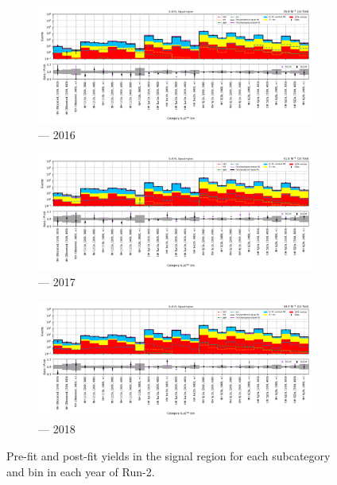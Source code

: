 \begin{figure}[htbp]
    \centering
    \begin{subfigure}[b]{0.9\textwidth}
        \includegraphics[width=\textwidth]{figures/mountain_ranges/2016/ttH/SR_tree_fit_s-abs_values_ttH_cats.pdf}
        \caption{\ttH --- 2016}
    \end{subfigure}

    \begin{subfigure}[b]{0.9\textwidth}
        \includegraphics[width=\textwidth]{figures/mountain_ranges/2017/ttH/SR_tree_fit_s-abs_values_ttH_cats.pdf}
        \caption{\ttH --- 2017}
    \end{subfigure}

    \begin{subfigure}[b]{0.9\textwidth}
        \includegraphics[width=\textwidth]{figures/mountain_ranges/2018/ttH/SR_tree_fit_s-abs_values_ttH_cats.pdf}
        \caption{\ttH --- 2018}
    \end{subfigure}
    \caption[Pre-fit and post-fit yields in the signal region for each \ttH subcategory and \ptmiss bin in each year of Run-2]{Pre-fit and post-fit yields in the signal region for each \ttH subcategory and \ptmiss bin in each year of Run-2.}
    \label{fig:htoinv_mountain_range_ttH_SR}
\end{figure}

